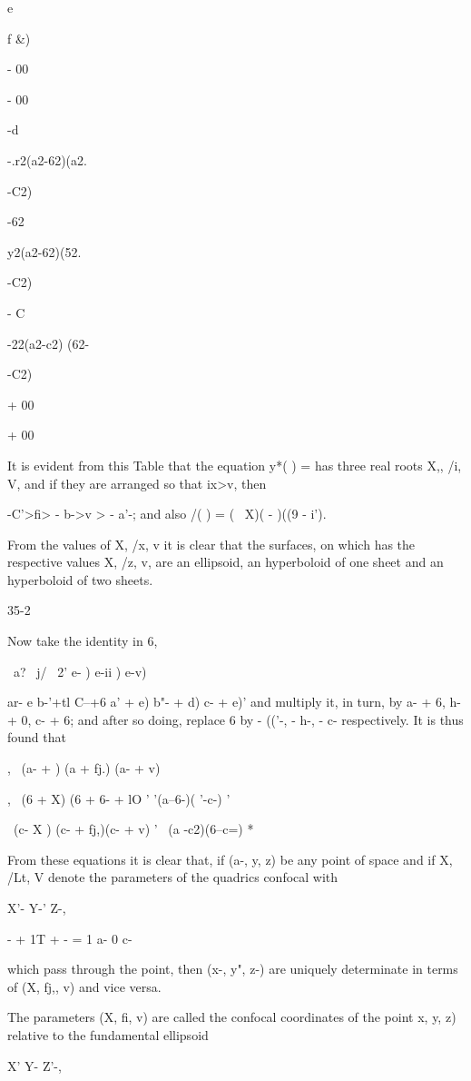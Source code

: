 {{e

f \&)

- 00

- 00

-d

-.r2(a2-62)(a2.

-C2)

-62

y2(a2-62)(52.

-C2)

- C

-22(a2-c2) (62-

-C2)

+ 00

+ 00

It is evident from this Table that the equation y*( ) = has three real
roots X,, /i, V, and if they are arranged so that ix>v, then

 -C'>fi> - b->v > - a'-; and also /( ) = ( \ X)( - )((9 - i').

From the values of X, /x, v it is clear that the surfaces, on which
has the respective values X, /z, v, are an ellipsoid, an hyperboloid
of one sheet and an hyperboloid of two sheets.

35-2

%
%

Now take the identity in 6,

\ a? \ j/ \ 2' e- ) e-ii ) e-v)

ar- e b-'+tl C--+6 a' + e) b"- + d) c- + e)' and multiply it, in turn,
by a- + 6, h- + 0, c- + 6; and after so doing, replace 6 by - (('-, -
h-, - c- respectively. It is thus found that

, \ (a- + ) (a + fj.) (a- + v)

, \ (6 + X) (6 + 6- + lO ' '(a--6-)( '-c-) '

  \ (c- X ) (c- + fj,)(c- + v) '~ (a -c2)(6--c=) *

From these equations it is clear that, if (a-, y, z) be any point of
space and if X, /Lt, V denote the parameters of the quadrics confocal
with

X'- Y-' Z-,

- + 1T + - = 1 a- 0 c-

which pass through the point, then (x-, y", z-) are uniquely
determinate in terms of (X, fj,, v) and vice versa.

The parameters (X, fi, v) are called the confocal coordinates of the
point x, y, z) relative to the fundamental ellipsoid

X' Y- Z'-,

}}
